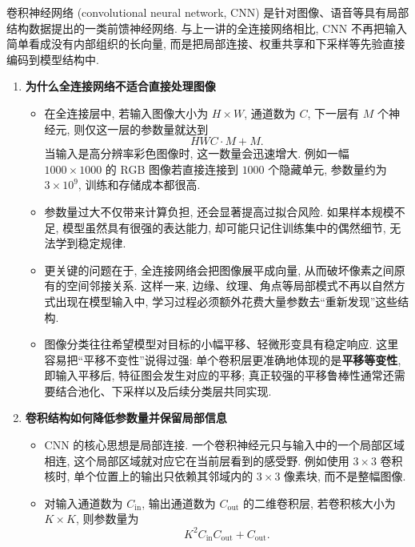 \documentclass{../nndlcourse}
\begin{document}
卷积神经网络 (convolutional neural network, CNN) 是针对图像、语音等具有局部结构数据提出的一类前馈神经网络. 与上一讲的全连接网络相比, CNN 不再把输入简单看成没有内部组织的长向量, 而是把局部连接、权重共享和下采样等先验直接编码到模型结构中.

\begin{enumerate}
    \item \textbf{为什么全连接网络不适合直接处理图像}
    \begin{itemize}
        \item 在全连接层中, 若输入图像大小为 $H \times W$, 通道数为 $C$, 下一层有 $M$ 个神经元, 则仅这一层的参数量就达到
        \begin{equation*}
            HWC \cdot M + M.
        \end{equation*}
        当输入是高分辨率彩色图像时, 这一数量会迅速增大. 例如一幅 $1000 \times 1000$ 的 RGB 图像若直接连接到 $1000$ 个隐藏单元, 参数量约为 $3 \times 10^9$, 训练和存储成本都很高.
        \item 参数量过大不仅带来计算负担, 还会显著提高过拟合风险. 如果样本规模不足, 模型虽然具有很强的表达能力, 却可能只记住训练集中的偶然细节, 无法学到稳定规律.
        \item 更关键的问题在于, 全连接网络会把图像展平成向量, 从而破坏像素之间原有的空间邻接关系. 这样一来, 边缘、纹理、角点等局部模式不再以自然方式出现在模型输入中, 学习过程必须额外花费大量参数去“重新发现”这些结构.
        \item 图像分类往往希望模型对目标的小幅平移、轻微形变具有稳定响应. 这里容易把“平移不变性”说得过强: 单个卷积层更准确地体现的是\textbf{平移等变性}, 即输入平移后, 特征图会发生对应的平移; 真正较强的平移鲁棒性通常还需要结合池化、下采样以及后续分类层共同实现.
    \end{itemize}
    \item \textbf{卷积结构如何降低参数量并保留局部信息}
    \begin{itemize}
        \item CNN 的核心思想是局部连接. 一个卷积神经元只与输入中的一个局部区域相连, 这个局部区域就对应它在当前层看到的感受野. 例如使用 $3 \times 3$ 卷积核时, 单个位置上的输出只依赖其邻域内的 $3 \times 3$ 像素块, 而不是整幅图像.
        \item 对输入通道数为 $C_{\mathrm{in}}$, 输出通道数为 $C_{\mathrm{out}}$ 的二维卷积层, 若卷积核大小为 $K \times K$, 则参数量为
        \begin{equation*}
            K^2 C_{\mathrm{in}} C_{\mathrm{out}} + C_{\mathrm{out}}.
        \end{equation*}

\end{itemize}
\end{enumerate}
\end{document}
